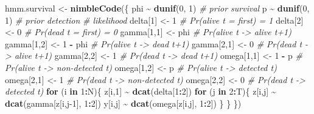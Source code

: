 \documentclass[
  12pt,
]{krantz}
\newenvironment{Shaded}{\begin{snugshade}}{\end{snugshade}}
\newcommand{\CommentTok}[1]{\textcolor[rgb]{0.56,0.35,0.01}{\textit{#1}}}
\newcommand{\ControlFlowTok}[1]{\textcolor[rgb]{0.13,0.29,0.53}{\textbf{#1}}}
\newcommand{\DecValTok}[1]{\textcolor[rgb]{0.00,0.00,0.81}{#1}}
\newcommand{\FunctionTok}[1]{\textcolor[rgb]{0.13,0.29,0.53}{\textbf{#1}}}
\newcommand{\NormalTok}[1]{#1}
\newcommand{\OtherTok}[1]{\textcolor[rgb]{0.56,0.35,0.01}{#1}}
\newcommand{\SpecialCharTok}[1]{\textcolor[rgb]{0.81,0.36,0.00}{\textbf{#1}}}
\begin{document}
\begin{Shaded}
\begin{Highlighting}[]
\NormalTok{hmm.survival }\OtherTok{\textless{}{-}} \FunctionTok{nimbleCode}\NormalTok{(\{}
\NormalTok{  phi }\SpecialCharTok{\textasciitilde{}} \FunctionTok{dunif}\NormalTok{(}\DecValTok{0}\NormalTok{, }\DecValTok{1}\NormalTok{) }\CommentTok{\# prior survival}
\NormalTok{  p }\SpecialCharTok{\textasciitilde{}} \FunctionTok{dunif}\NormalTok{(}\DecValTok{0}\NormalTok{, }\DecValTok{1}\NormalTok{) }\CommentTok{\# prior detection}
  \CommentTok{\# likelihood}
\NormalTok{  delta[}\DecValTok{1}\NormalTok{] }\OtherTok{\textless{}{-}} \DecValTok{1}          \CommentTok{\# Pr(alive t = first) = 1}
\NormalTok{  delta[}\DecValTok{2}\NormalTok{] }\OtherTok{\textless{}{-}} \DecValTok{0}          \CommentTok{\# Pr(dead t = first) = 0}
\NormalTok{  gamma[}\DecValTok{1}\NormalTok{,}\DecValTok{1}\NormalTok{] }\OtherTok{\textless{}{-}}\NormalTok{ phi      }\CommentTok{\# Pr(alive t {-}\textgreater{} alive t+1)}
\NormalTok{  gamma[}\DecValTok{1}\NormalTok{,}\DecValTok{2}\NormalTok{] }\OtherTok{\textless{}{-}} \DecValTok{1} \SpecialCharTok{{-}}\NormalTok{ phi  }\CommentTok{\# Pr(alive t {-}\textgreater{} dead t+1)}
\NormalTok{  gamma[}\DecValTok{2}\NormalTok{,}\DecValTok{1}\NormalTok{] }\OtherTok{\textless{}{-}} \DecValTok{0}        \CommentTok{\# Pr(dead t {-}\textgreater{} alive t+1)}
\NormalTok{  gamma[}\DecValTok{2}\NormalTok{,}\DecValTok{2}\NormalTok{] }\OtherTok{\textless{}{-}} \DecValTok{1}        \CommentTok{\# Pr(dead t {-}\textgreater{} dead t+1)}
\NormalTok{  omega[}\DecValTok{1}\NormalTok{,}\DecValTok{1}\NormalTok{] }\OtherTok{\textless{}{-}} \DecValTok{1} \SpecialCharTok{{-}}\NormalTok{ p    }\CommentTok{\# Pr(alive t {-}\textgreater{} non{-}detected t)}
\NormalTok{  omega[}\DecValTok{1}\NormalTok{,}\DecValTok{2}\NormalTok{] }\OtherTok{\textless{}{-}}\NormalTok{ p        }\CommentTok{\# Pr(alive t {-}\textgreater{} detected t)}
\NormalTok{  omega[}\DecValTok{2}\NormalTok{,}\DecValTok{1}\NormalTok{] }\OtherTok{\textless{}{-}} \DecValTok{1}        \CommentTok{\# Pr(dead t {-}\textgreater{} non{-}detected t)}
\NormalTok{  omega[}\DecValTok{2}\NormalTok{,}\DecValTok{2}\NormalTok{] }\OtherTok{\textless{}{-}} \DecValTok{0}        \CommentTok{\# Pr(dead t {-}\textgreater{} detected t)}
  \ControlFlowTok{for}\NormalTok{ (i }\ControlFlowTok{in} \DecValTok{1}\SpecialCharTok{:}\NormalTok{N)\{}
\NormalTok{    z[i,}\DecValTok{1}\NormalTok{] }\SpecialCharTok{\textasciitilde{}} \FunctionTok{dcat}\NormalTok{(delta[}\DecValTok{1}\SpecialCharTok{:}\DecValTok{2}\NormalTok{])}
    \ControlFlowTok{for}\NormalTok{ (j }\ControlFlowTok{in} \DecValTok{2}\SpecialCharTok{:}\NormalTok{T)\{}
\NormalTok{      z[i,j] }\SpecialCharTok{\textasciitilde{}} \FunctionTok{dcat}\NormalTok{(gamma[z[i,j}\DecValTok{{-}1}\NormalTok{], }\DecValTok{1}\SpecialCharTok{:}\DecValTok{2}\NormalTok{])}
\NormalTok{      y[i,j] }\SpecialCharTok{\textasciitilde{}} \FunctionTok{dcat}\NormalTok{(omega[z[i,j], }\DecValTok{1}\SpecialCharTok{:}\DecValTok{2}\NormalTok{])}
\NormalTok{    \}}
\NormalTok{  \}}
\NormalTok{\})}
\end{Highlighting}
\end{Shaded}
\end{document}
